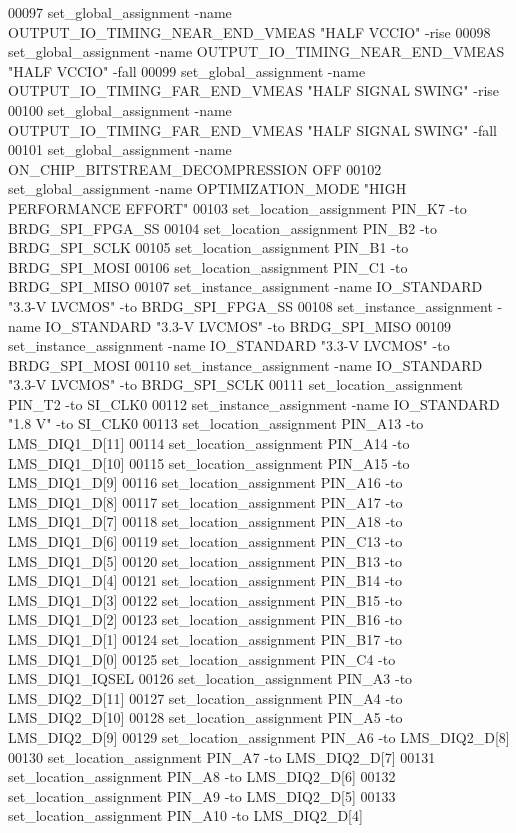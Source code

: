 \begin{DoxyCode}
00097 set\_global\_assignment -name OUTPUT\_IO\_TIMING\_NEAR\_END\_VMEAS "HALF VCCIO" -rise
00098 set\_global\_assignment -name OUTPUT\_IO\_TIMING\_NEAR\_END\_VMEAS "HALF VCCIO" -fall
00099 set\_global\_assignment -name OUTPUT\_IO\_TIMING\_FAR\_END\_VMEAS "HALF \textcolor{keywordflow}{SIGNAL} SWING" -rise
00100 set\_global\_assignment -name OUTPUT\_IO\_TIMING\_FAR\_END\_VMEAS "HALF \textcolor{keywordflow}{SIGNAL} SWING" -fall
00101 set\_global\_assignment -name ON\_CHIP\_BITSTREAM\_DECOMPRESSION OFF
00102 set\_global\_assignment -name OPTIMIZATION\_MODE "HIGH PERFORMANCE EFFORT"
00103 set\_location\_assignment PIN\_K7 -to BRDG\_SPI\_FPGA\_SS
00104 set\_location\_assignment PIN\_B2 -to BRDG\_SPI\_SCLK
00105 set\_location\_assignment PIN\_B1 -to BRDG\_SPI\_MOSI
00106 set\_location\_assignment PIN\_C1 -to BRDG\_SPI\_MISO
00107 set\_instance\_assignment -name IO\_STANDARD "3.3-V LVCMOS" -to BRDG\_SPI\_FPGA\_SS
00108 set\_instance\_assignment -name IO\_STANDARD "3.3-V LVCMOS" -to BRDG\_SPI\_MISO
00109 set\_instance\_assignment -name IO\_STANDARD "3.3-V LVCMOS" -to BRDG\_SPI\_MOSI
00110 set\_instance\_assignment -name IO\_STANDARD "3.3-V LVCMOS" -to BRDG\_SPI\_SCLK
00111 set\_location\_assignment PIN\_T2 -to SI\_CLK0
00112 set\_instance\_assignment -name IO\_STANDARD "1.\textcolor{vhdllogic}{8} V" -to SI\_CLK0
00113 set\_location\_assignment PIN\_A13 -to LMS\_DIQ1\_D[11]
00114 set\_location\_assignment PIN\_A14 -to LMS\_DIQ1\_D[10]
00115 set\_location\_assignment PIN\_A15 -to LMS\_DIQ1\_D[9]
00116 set\_location\_assignment PIN\_A16 -to LMS\_DIQ1\_D[8]
00117 set\_location\_assignment PIN\_A17 -to LMS\_DIQ1\_D[7]
00118 set\_location\_assignment PIN\_A18 -to LMS\_DIQ1\_D[6]
00119 set\_location\_assignment PIN\_C13 -to LMS\_DIQ1\_D[5]
00120 set\_location\_assignment PIN\_B13 -to LMS\_DIQ1\_D[4]
00121 set\_location\_assignment PIN\_B14 -to LMS\_DIQ1\_D[3]
00122 set\_location\_assignment PIN\_B15 -to LMS\_DIQ1\_D[2]
00123 set\_location\_assignment PIN\_B16 -to LMS\_DIQ1\_D[1]
00124 set\_location\_assignment PIN\_B17 -to LMS\_DIQ1\_D[0]
00125 set\_location\_assignment PIN\_C4 -to LMS\_DIQ1\_IQSEL
00126 set\_location\_assignment PIN\_A3 -to LMS\_DIQ2\_D[11]
00127 set\_location\_assignment PIN\_A4 -to LMS\_DIQ2\_D[10]
00128 set\_location\_assignment PIN\_A5 -to LMS\_DIQ2\_D[9]
00129 set\_location\_assignment PIN\_A6 -to LMS\_DIQ2\_D[8]
00130 set\_location\_assignment PIN\_A7 -to LMS\_DIQ2\_D[7]
00131 set\_location\_assignment PIN\_A8 -to LMS\_DIQ2\_D[6]
00132 set\_location\_assignment PIN\_A9 -to LMS\_DIQ2\_D[5]
00133 set\_location\_assignment PIN\_A10 -to LMS\_DIQ2\_D[4]

\end{DoxyCode}
